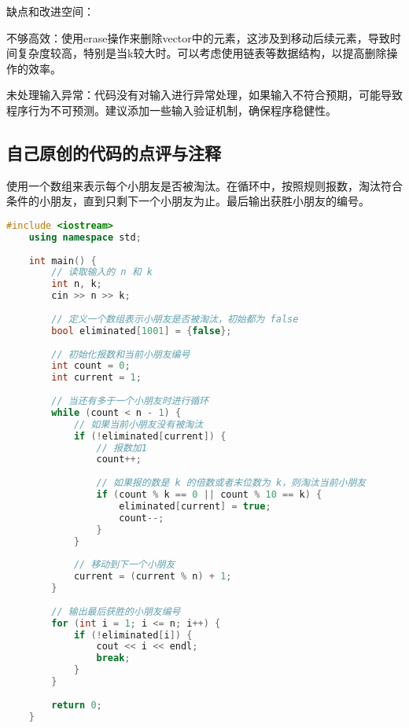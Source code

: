 缺点和改进空间：

不够高效：使用erase操作来删除vector中的元素，这涉及到移动后续元素，导致时间复杂度较高，特别是当k较大时。可以考虑使用链表等数据结构，以提高删除操作的效率。

未处理输入异常：代码没有对输入进行异常处理，如果输入不符合预期，可能导致程序行为不可预测。建议添加一些输入验证机制，确保程序稳健性。

\subsection{自己原创的代码的点评与注释}

使用一个数组来表示每个小朋友是否被淘汰。在循环中，按照规则报数，淘汰符合条件的小朋友，直到只剩下一个小朋友为止。最后输出获胜小朋友的编号。

\begin{lstlisting}[language=C++]
    #include <iostream>
    using namespace std;
    
    int main() {
        // 读取输入的 n 和 k
        int n, k;
        cin >> n >> k;
    
        // 定义一个数组表示小朋友是否被淘汰，初始都为 false
        bool eliminated[1001] = {false};
    
        // 初始化报数和当前小朋友编号
        int count = 0;
        int current = 1;
    
        // 当还有多于一个小朋友时进行循环
        while (count < n - 1) {
            // 如果当前小朋友没有被淘汰
            if (!eliminated[current]) {
                // 报数加1
                count++;
    
                // 如果报的数是 k 的倍数或者末位数为 k，则淘汰当前小朋友
                if (count % k == 0 || count % 10 == k) {
                    eliminated[current] = true;
                    count--;
                }
            }
    
            // 移动到下一个小朋友
            current = (current % n) + 1;
        }
    
        // 输出最后获胜的小朋友编号
        for (int i = 1; i <= n; i++) {
            if (!eliminated[i]) {
                cout << i << endl;
                break;
            }
        }
    
        return 0;
    }    
\end{lstlisting}